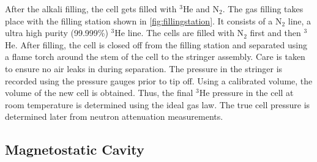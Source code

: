 After the alkali filling, the cell gets filled with $^3$He and N$_2$. The gas filling takes place with the filling station shown in \cref{fig:fillingstation}. It consists of a N$_2$ line, a ultra high purity (99.999\%) $^3$He line. The cells are filled with N$_2$ first and then $^3$He. After filling, the cell is closed off from the filling station and separated using a flame torch around the stem of the cell to the stringer assembly. Care is taken to ensure no air leaks in during separation. The pressure in the stringer is recorded using the pressure gauges prior to tip off. Using a calibrated volume, the volume of the new cell is obtained. Thus, the final $^3$He pressure in the cell at room temperature is determined using the ideal gas law. The true cell pressure is determined later from neutron attenuation measurements.

\subsection{Magnetostatic Cavity}


